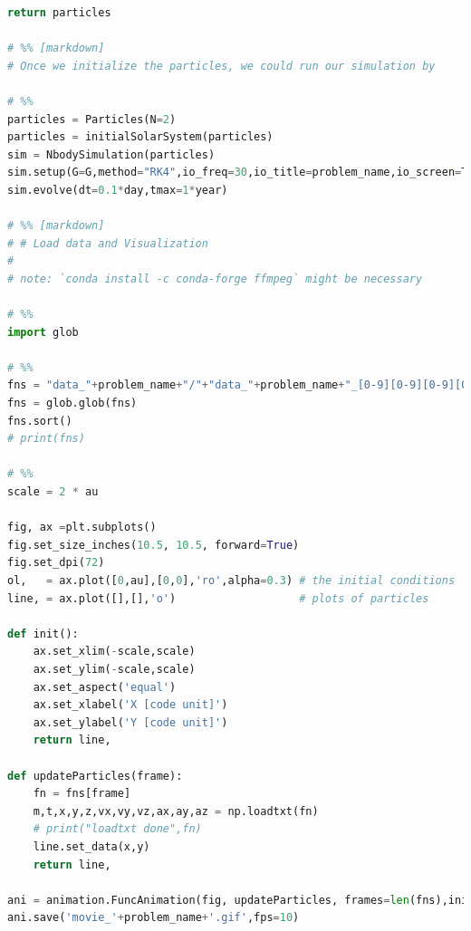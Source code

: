 \documentclass[12pt]{article}
\begin{document}
\begin{lstlisting}[language={Python}]
    return particles

# %% [markdown]
# Once we initialize the particles, we could run our simulation by

# %%
particles = Particles(N=2)
particles = initialSolarSystem(particles)
sim = NbodySimulation(particles)
sim.setup(G=G,method="RK4",io_freq=30,io_title=problem_name,io_screen=True,visualized=False)
sim.evolve(dt=0.1*day,tmax=1*year)

# %% [markdown]
# # Load data and Visualization
# 
# note: `conda install -c conda-forge ffmpeg` might be necessary

# %%
import glob

# %%
fns = "data_"+problem_name+"/"+"data_"+problem_name+"_[0-9][0-9][0-9][0-9][0-9].txt"
fns = glob.glob(fns)
fns.sort()
# print(fns)

# %%
scale = 2 * au

fig, ax =plt.subplots()
fig.set_size_inches(10.5, 10.5, forward=True)
fig.set_dpi(72)
ol,   = ax.plot([0,au],[0,0],'ro',alpha=0.3) # the initial conditions
line, = ax.plot([],[],'o')                   # plots of particles

def init():
    ax.set_xlim(-scale,scale)
    ax.set_ylim(-scale,scale)
    ax.set_aspect('equal')
    ax.set_xlabel('X [code unit]')
    ax.set_ylabel('Y [code unit]')
    return line,

def updateParticles(frame):
    fn = fns[frame]
    m,t,x,y,z,vx,vy,vz,ax,ay,az = np.loadtxt(fn)
    # print("loadtxt done",fn)
    line.set_data(x,y)
    return line,

ani = animation.FuncAnimation(fig, updateParticles, frames=len(fns),init_func=init, blit=True)
ani.save('movie_'+problem_name+'.gif',fps=10)
        
        \end{lstlisting}
\end{document}
